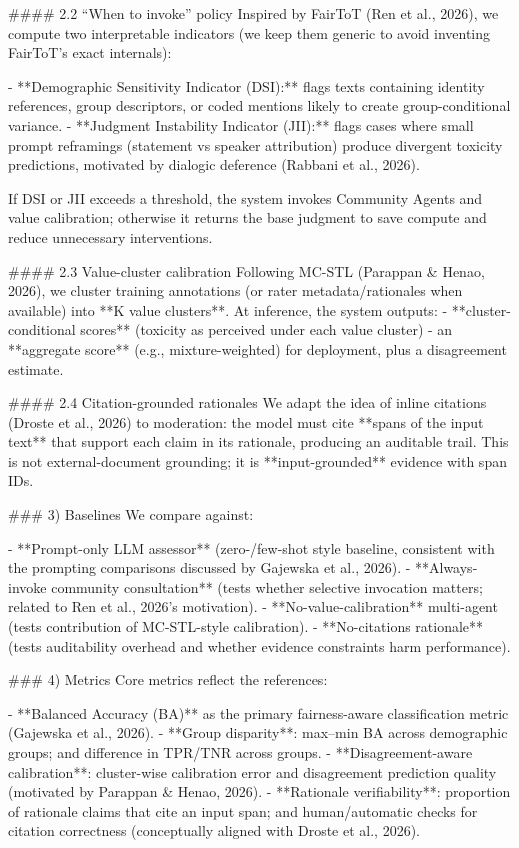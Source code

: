#### 2.2 “When to invoke” policy  
Inspired by FairToT (Ren et al., 2026), we compute two interpretable indicators (we keep them generic to avoid inventing FairToT’s exact internals):

- **Demographic Sensitivity Indicator (DSI):** flags texts containing identity references, group descriptors, or coded mentions likely to create group-conditional variance.  
- **Judgment Instability Indicator (JII):** flags cases where small prompt reframings (statement vs speaker attribution) produce divergent toxicity predictions, motivated by dialogic deference (Rabbani et al., 2026).

If DSI or JII exceeds a threshold, the system invokes Community Agents and value calibration; otherwise it returns the base judgment to save compute and reduce unnecessary interventions.

#### 2.3 Value-cluster calibration  
Following MC-STL (Parappan & Henao, 2026), we cluster training annotations (or rater metadata/rationales when available) into **K value clusters**. At inference, the system outputs:
- **cluster-conditional scores** (toxicity as perceived under each value cluster)  
- an **aggregate score** (e.g., mixture-weighted) for deployment, plus a disagreement estimate.

#### 2.4 Citation-grounded rationales  
We adapt the idea of inline citations (Droste et al., 2026) to moderation: the model must cite **spans of the input text** that support each claim in its rationale, producing an auditable trail. This is not external-document grounding; it is **input-grounded** evidence with span IDs.

### 3) Baselines  
We compare against:

- **Prompt-only LLM assessor** (zero-/few-shot style baseline, consistent with the prompting comparisons discussed by Gajewska et al., 2026).  
- **Always-invoke community consultation** (tests whether selective invocation matters; related to Ren et al., 2026’s motivation).  
- **No-value-calibration** multi-agent (tests contribution of MC-STL-style calibration).  
- **No-citations rationale** (tests auditability overhead and whether evidence constraints harm performance).

### 4) Metrics  
Core metrics reflect the references:

- **Balanced Accuracy (BA)** as the primary fairness-aware classification metric (Gajewska et al., 2026).  
- **Group disparity**: max–min BA across demographic groups; and difference in TPR/TNR across groups.  
- **Disagreement-aware calibration**: cluster-wise calibration error and disagreement prediction quality (motivated by Parappan & Henao, 2026).  
- **Rationale verifiability**: proportion of rationale claims that cite an input span; and human/automatic checks for citation correctness (conceptually aligned with Droste et al., 2026).


